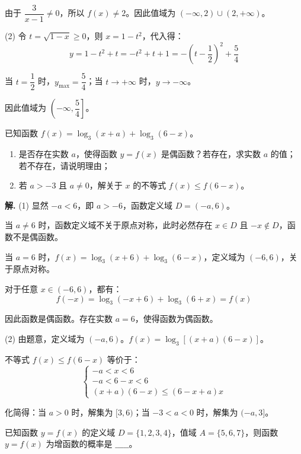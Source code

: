 \documentclass[11pt]{ctexrep}
\begin{document}
由于 $\dfrac{3}{x-1} \neq 0$，所以 $f(x) \neq 2$。因此值域为 $(-\infty, 2) \cup (2, +\infty)$。

(2) 令 $t = \sqrt{1-x} \geq 0$，则 $x = 1-t^2$，代入得：
\[
    y = 1-t^2 + t = -t^2 + t + 1 = -\left(t-\frac{1}{2}\right)^2 + \frac{5}{4}
\]

当 $t = \dfrac{1}{2}$ 时，$y_{\max} = \dfrac{5}{4}$；当 $t \to +\infty$ 时，$y \to -\infty$。

因此值域为 $\left(-\infty, \dfrac{5}{4}\right]$。

\begin{realexam}[2025 上海高三二模]
    已知函数 $f(x) = \log_3(x+a) + \log_3(6-x)$。
    \begin{enumerate}
        \item 是否存在实数 $a$，使得函数 $y = f(x)$ 是偶函数？若存在，求实数 $a$ 的值；若不存在，请说明理由；
        \item 若 $a > -3$ 且 $a \neq 0$，解关于 $x$ 的不等式 $f(x) \leq f(6-x)$。
    \end{enumerate}
\end{realexam}

\textbf{解.} (1) 显然 $-a < 6$，即 $a > -6$，函数定义域 $D = (-a, 6)$。

当 $a \neq 6$ 时，函数定义域不关于原点对称，此时必然存在 $x \in D$ 且 $-x \notin D$，函数不是偶函数。

当 $a = 6$ 时，$f(x) = \log_3(x+6) + \log_3(6-x)$，定义域为 $(-6, 6)$，关于原点对称。

对于任意 $x \in (-6, 6)$，都有：
\[
    f(-x) = \log_3(-x+6) + \log_3(6+x) = f(x)
\]

因此函数是偶函数。存在实数 $a = 6$，使得函数为偶函数。

(2) 由题意，定义域为 $(-a, 6)$。$f(x) = \log_3[(x+a)(6-x)]$。

不等式 $f(x) \leq f(6-x)$ 等价于：
\[
    \begin{cases}
        -a < x < 6 \\[4pt]
        -a < 6-x < 6 \\[4pt]
        (x+a)(6-x) \leq (6-x+a)x
    \end{cases}
\]

化简得：当 $a > 0$ 时，解集为 $[3, 6)$；当 $-3 < a < 0$ 时，解集为 $(-a, 3]$。

\begin{realexam}[2025 上海高三一模]
    已知函数 $y = f(x)$ 的定义域 $D = \{1, 2, 3, 4\}$，值域 $A = \{5, 6, 7\}$，则函数 $y = f(x)$ 为增函数的概率是 $\_\_\_\_\_$。
\end{realexam}
\end{document}
